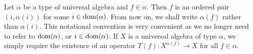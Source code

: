 Let $\alpha$ be a type of universal algebra and $f\in\alpha$. Then
$f$ is an ordered pair $(i,\alpha(i))$ for some $i\in \mbox{\rm dom}(\alpha)$.
From now on, we shall write $\alpha(f)$ rather than $\alpha(i)$.
This notational convention is very convenient as we no longer need
to refer to $\mbox{\rm dom}(\alpha)$, or $i\in \mbox{\rm dom}(\alpha)$. If $X$ is a
universal algebra of type $\alpha$, we simply require the existence
of an operator $T(f):X^{\alpha(f)}\to X$ for all $f\in\alpha$.
